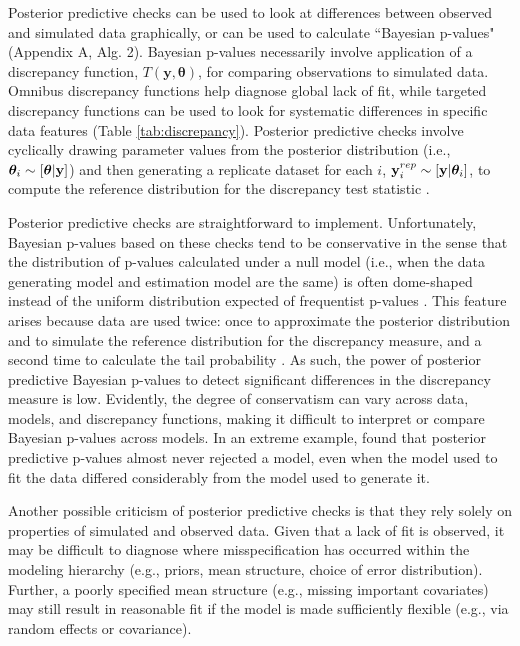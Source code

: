 \documentclass[12pt,english]{article}
\begin{document}
\begin{spacing}{1.9}
Posterior predictive checks can be used to look at differences between
observed and simulated data graphically, or can be used to calculate
``Bayesian p-values" (Appendix A, Alg. 2).  Bayesian p-values
necessarily involve application of a discrepancy function,
$T(\textbf{y},\boldsymbol{\theta})$, for comparing observations to
simulated data.  Omnibus discrepancy functions help diagnose global
lack of fit, while targeted discrepancy functions can be used to look
for systematic differences in specific data features (Table
\ref{tab:discrepancy}).  Posterior predictive checks involve
cyclically drawing parameter values from the posterior distribution
(i.e., $\boldsymbol{\theta}_i \sim [\boldsymbol{\theta}| {\bf y}]$) and then generating a
replicate dataset for each $i$,
${\bf y}_i^{rep} \sim [{\bf y} | \boldsymbol{\theta}_i]$, to compute the reference
distribution for the discrepancy test statistic \citep[][Appendix A,
Alg. 2]{GelmanEtAl2014}.

Posterior predictive checks are straightforward to implement.
Unfortunately, Bayesian p-values based on these checks tend to be
conservative in the sense that the distribution of p-values calculated
under a null model (i.e., when the data generating model and
estimation model are the same) is often dome-shaped instead of the
uniform distribution expected of frequentist p-values
\citep{RobinsEtAl2000}. This feature arises because data are used
twice: once to approximate the posterior distribution and to simulate
the reference distribution for the discrepancy measure, and a second
time to calculate the tail probability \citep{BayarriBerger2000}.  As
such, the power of posterior predictive Bayesian p-values to detect
significant differences in the discrepancy measure is low.  Evidently,
the degree of conservatism can vary across data, models, and
discrepancy functions, making it difficult to interpret or compare
Bayesian p-values across models. In an extreme example,
\citet{Zhang2014} found that posterior predictive p-values almost
never rejected a model, even when the model used to fit the data
differed considerably from the model used to generate it.

Another possible criticism of posterior predictive checks is that they
rely solely on properties of simulated and observed data.  Given that
a lack of fit is observed, it may be difficult to diagnose where
misspecification has occurred within the modeling hierarchy (e.g.,
priors, mean structure, choice of error distribution).  Further, a
poorly specified mean structure (e.g., missing important covariates)
may still result in reasonable fit if the model is made sufficiently
flexible (e.g., via random effects or covariance).


\end{spacing}
\end{document}
